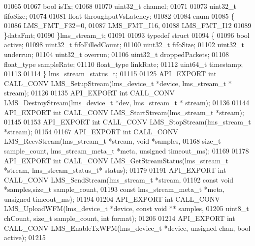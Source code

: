 \begin{DoxyCode}
01065 
01067     \textcolor{keywordtype}{bool} isTx;
01068 
01070     uint32\_t channel;
01071 
01073     uint32\_t fifoSize;
01074 
01081     \textcolor{keywordtype}{float} throughputVsLatency;
01082 
01084     \textcolor{keyword}{enum}
01085     \{
01086         LMS\_FMT\_F32=0,    
01087         LMS_FMT_I16,      
01088         LMS\_FMT\_I12       
01089     \}dataFmt;
01090 \}lms_stream_t;
01091 
01093 \textcolor{keyword}{typedef} \textcolor{keyword}{struct}
01094 \{
01096     \textcolor{keywordtype}{bool} active;
01098     uint32\_t fifoFilledCount;
01100     uint32\_t fifoSize;
01102     uint32\_t underrun;
01104     uint32\_t overrun;
01106     uint32\_t droppedPackets;
01108     float\_type sampleRate;
01110     float\_type linkRate;
01112     uint64\_t timestamp;
01113 
01114 \} lms_stream_status_t;
01115 
01125 API_EXPORT \textcolor{keywordtype}{int} CALL_CONV LMS_SetupStream(lms\_device\_t *device, lms_stream_t *
      stream);
01126 
01135 API_EXPORT \textcolor{keywordtype}{int} CALL_CONV LMS_DestroyStream(lms\_device\_t *dev, lms_stream_t *
      stream);
01136 
01144 API_EXPORT \textcolor{keywordtype}{int} CALL_CONV LMS_StartStream(lms_stream_t *stream);
01145 
01153 API_EXPORT \textcolor{keywordtype}{int} CALL_CONV LMS_StopStream(lms_stream_t *stream);
01154 
01167  API_EXPORT \textcolor{keywordtype}{int} CALL_CONV LMS_RecvStream(lms_stream_t *stream, \textcolor{keywordtype}{void} *samples,
01168              \textcolor{keywordtype}{size\_t} sample_count, lms_stream_meta_t *meta, \textcolor{keywordtype}{unsigned} timeout_ms);
01169 
01178 API_EXPORT \textcolor{keywordtype}{int} CALL_CONV LMS_GetStreamStatus(lms_stream_t *stream, 
      lms_stream_status_t* status);
01179 
01191 API_EXPORT \textcolor{keywordtype}{int} CALL_CONV LMS_SendStream(lms_stream_t *stream,
01192                             \textcolor{keyword}{const} \textcolor{keywordtype}{void} *samples,\textcolor{keywordtype}{size\_t} sample_count,
01193                             \textcolor{keyword}{const} lms_stream_meta_t *meta, \textcolor{keywordtype}{unsigned} timeout_ms);
01194 
01204 API_EXPORT \textcolor{keywordtype}{int} CALL_CONV LMS_UploadWFM(lms\_device\_t *device, \textcolor{keyword}{const} \textcolor{keywordtype}{void} **
      samples,
01205                                 uint8\_t chCount, \textcolor{keywordtype}{size\_t} sample_count, \textcolor{keywordtype}{int} format);
01206 
01214 API_EXPORT \textcolor{keywordtype}{int} CALL_CONV LMS_EnableTxWFM(lms\_device\_t *device, \textcolor{keywordtype}{unsigned} chan, \textcolor{keywordtype}{bool} 
      active);
01215 

\end{DoxyCode}
